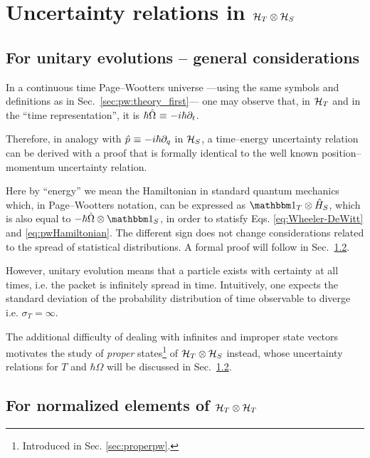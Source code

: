 \section{Uncertainty relations in $\mathcal{H}_T \otimes \mathcal{H}_S$}\label{sec:pw:uncertainty}

\subsection{For unitary evolutions -- general considerations}
\label{sec:pw:unitary-general}

In a continuous time Page--Wootters universe
---using the same symbols and definitions as in Sec.~\ref{sec:pw:theory_first}---
one may observe that,
in $\mathcal{H}_T$ and in the ``time representation'',
it is $\hbar\hat{\Omega} \operatorname*{\,\equiv\,} -i\hbar\partial_{t}$.

Therefore, in analogy with $\hat{p} \operatorname*{\,\equiv\,} -i\hbar\partial_{q}$ in $\mathcal{H}_S$,
a time--energy uncertainty relation can be derived
with a proof that is formally identical to the well known
position--momentum uncertainty relation.

Here by ``energy'' we mean the Hamiltonian in standard quantum mechanics which,
in Page--Wootters notation,
can be expressed as $\idop_T \ox \op{H}_S$, which is also equal to
$-\hbar\op{\Omega} \ox \idop_S$, in order to statisfy Eqs. \eqref{eq:Wheeler-DeWitt} and \eqref{eq:pwHamiltonian}.
The different sign does not change considerations related to the spread of statistical distributions.
A formal proof will follow in Sec.~\ref{sec:for-normalized-elements}.

However, unitary evolution means that a particle exists with
certainty at all times, i.e. the packet
is infinitely spread in time.
Intuitively,
one expects the standard deviation
of the probability distribution of time observable
to diverge i.e.
$\sigma_T = \infty$.

The additional difficulty of dealing with infinites and improper state vectors
motivates the study of \emph{proper} states\footnote{
  Introduced in Sec. \ref{sec:properpw}.
}
of $\mathcal{H}_T \otimes \mathcal{H}_S$
instead, whose uncertainty relations for $T$ and $\hbar\Omega$ will be discussed in Sec.~\ref{sec:for-normalized-elements}.

\subsection{For normalized elements of $\mathcal{H}_T \otimes \mathcal{H}_T$}\label{sec:for-normalized-elements}

